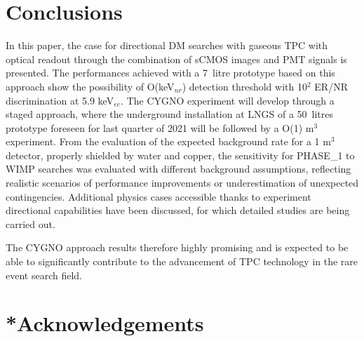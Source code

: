 \documentclass[physics,article,submit,moreauthors,pdftex]{Definitions/mdpi}
\begin{document}


\section{Conclusions}
In this paper, the case for directional DM searches with gaseous TPC with optical readout through the combination of sCMOS images and PMT signals is presented. The performances achieved with a 7~litre prototype based on this approach show the possibility of O(keV$_{nr}$) detection threshold with 10$^2$ ER/NR discrimination at 5.9 keV$_{ee}$.
The CYGNO experiment will develop through a staged approach, where the underground installation at LNGS of a 50~litres prototype foreseen for last quarter of 2021 will be followed by a O(1) m$^3$ experiment. From the evaluation of the expected background rate for a 1 m$^3$ detector, properly shielded by water and copper, the sensitivity for PHASE\_1 to WIMP searches was evaluated with different background assumptions, reflecting realistic scenarios of performance improvements or underestimation of unexpected contingencies. Additional  physics cases accessible thanks to experiment directional capabilities have been discussed, for which detailed studies are being carried out.

The CYGNO approach results therefore highly promising and is expected to be able to significantly contribute to the advancement of TPC technology in the rare event search field.

\section{*Acknowledgements}

\newpage
\appendixstart
\appendix
\end{document}
